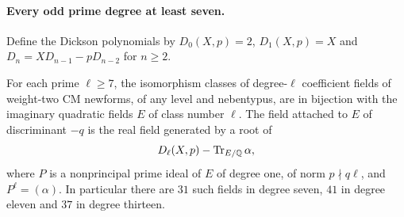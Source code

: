 \paragraph{Every odd prime degree at least seven.}
Define the Dickson polynomials by $D_0(X,p)=2$, $D_1(X,p)=X$ and
$D_n=XD_{n-1}-pD_{n-2}$ for $n\ge2$.

\begin{theorem}\label{dir:thm:cmoddprime}
For each prime $\ell\ge7$, the isomorphism classes of degree-$\ell$ coefficient fields
of weight-two CM newforms, of any level and nebentypus, are in bijection with the
imaginary quadratic fields $E$ of class number $\ell$. The field attached to $E$ of
discriminant $-q$ is the real field generated by a root of
\[
 D_\ell(X,p)-\operatorname{Tr}_{E/\mathbb{Q}}\alpha ,
\]
where $P$ is a nonprincipal prime ideal of $E$ of degree one, of norm $p\nmid q\ell$,
and $P^\ell=(\alpha)$. In particular there are $31$ such fields in degree seven, $41$
in degree eleven and $37$ in degree thirteen.
\end{theorem}

